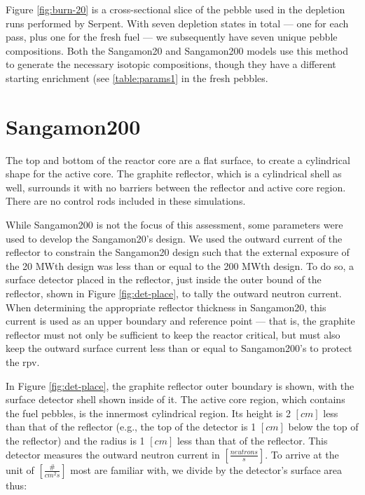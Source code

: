 

Figure \ref{fig:burn-20} is a cross-sectional slice of the pebble used in the depletion runs performed by Serpent.  With seven depletion states in total --- one for each pass, plus one for the fresh fuel --- we subsequently have seven unique pebble compositions.  Both the Sangamon20 and Sangamon200 models use this method to generate the necessary isotopic compositions, though they have a different starting enrichment (see \ref{table:params1} in the fresh pebbles.


\section{Sangamon200}
\label{s200}
The top and bottom of the reactor core are a flat surface, to create a cylindrical shape for the active core.  The graphite reflector, which is a cylindrical shell as well, surrounds it with no barriers between the reflector and active core region. There are no control rods included in these simulations.



While Sangamon200 is not the focus of this assessment, some parameters were used to develop the Sangamon20's design.  We used the outward current of the reflector to constrain the Sangamon20 design such that the external exposure of the 20 MWth design was less than or equal to the 200 MWth design.  To do so, a surface detector placed in the reflector, just inside the outer bound of the reflector, shown in Figure \ref{fig:det-place}, to tally the outward neutron current.  When determining the appropriate reflector thickness in Sangamon20, this current is used as an upper boundary and reference point --- that is, the graphite reflector must not only be sufficient to keep the reactor critical, but must also keep the outward surface current less than or equal to Sangamon200's to protect the \acrshort{rpv}.



In Figure \ref{fig:det-place}, the graphite reflector outer boundary is shown, with the surface detector shell shown inside of it.  The active core region, which contains the fuel pebbles, is the innermost cylindrical region.  Its height is 2 $\left[cm\right]$ less than that of the reflector (e.g., the top of the detector is 1 $\left[cm\right]$ below the top of the reflector) and the radius is 1 $\left[cm\right]$ less than that of the reflector.  This detector measures the outward neutron current in $\left[\frac{neutrons}{s}\right]$.  To arrive at the unit of $\left[\frac{\#}{cm^2s}\right]$ most are familiar with, we divide by the detector's surface area thus:

